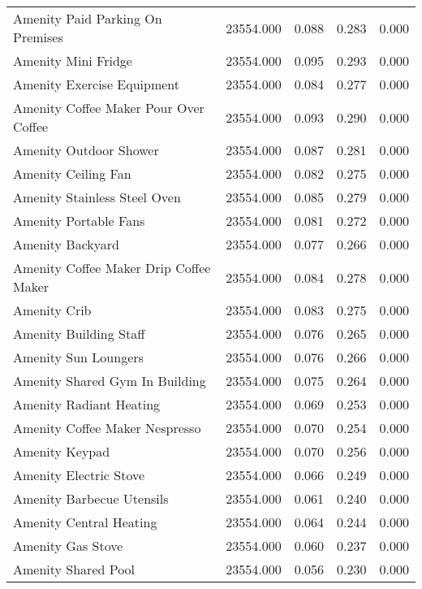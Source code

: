 \begin{tabular}{lllll}
Amenity Paid Parking On Premises & 23554.000 & 0.088 & 0.283 & 0.000 \\
Amenity Mini Fridge & 23554.000 & 0.095 & 0.293 & 0.000 \\
Amenity Exercise Equipment & 23554.000 & 0.084 & 0.277 & 0.000 \\
Amenity Coffee Maker Pour Over Coffee & 23554.000 & 0.093 & 0.290 & 0.000 \\
Amenity Outdoor Shower & 23554.000 & 0.087 & 0.281 & 0.000 \\
Amenity Ceiling Fan & 23554.000 & 0.082 & 0.275 & 0.000 \\
Amenity Stainless Steel Oven & 23554.000 & 0.085 & 0.279 & 0.000 \\
Amenity Portable Fans & 23554.000 & 0.081 & 0.272 & 0.000 \\
Amenity Backyard & 23554.000 & 0.077 & 0.266 & 0.000 \\
Amenity Coffee Maker Drip Coffee Maker & 23554.000 & 0.084 & 0.278 & 0.000 \\
Amenity Crib & 23554.000 & 0.083 & 0.275 & 0.000 \\
Amenity Building Staff & 23554.000 & 0.076 & 0.265 & 0.000 \\
Amenity Sun Loungers & 23554.000 & 0.076 & 0.266 & 0.000 \\
Amenity Shared Gym In Building & 23554.000 & 0.075 & 0.264 & 0.000 \\
Amenity Radiant Heating & 23554.000 & 0.069 & 0.253 & 0.000 \\
Amenity Coffee Maker Nespresso & 23554.000 & 0.070 & 0.254 & 0.000 \\
Amenity Keypad & 23554.000 & 0.070 & 0.256 & 0.000 \\
Amenity Electric Stove & 23554.000 & 0.066 & 0.249 & 0.000 \\
Amenity Barbecue Utensils & 23554.000 & 0.061 & 0.240 & 0.000 \\
Amenity Central Heating & 23554.000 & 0.064 & 0.244 & 0.000 \\
Amenity Gas Stove & 23554.000 & 0.060 & 0.237 & 0.000 \\
Amenity Shared Pool & 23554.000 & 0.056 & 0.230 & 0.000 \\
\bottomrule
\end{tabular}
